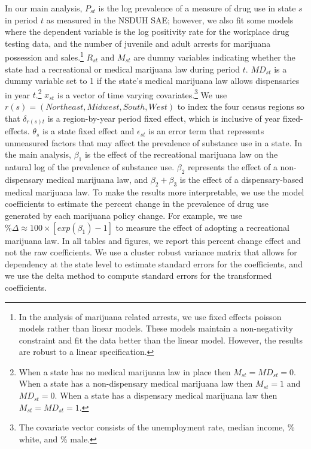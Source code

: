 \documentclass[12pt]{article}%
\begin{document}
In our main analysis, $P_{st}$ is the log prevalence of a measure of drug use in state $s$ in period $t$ as measured in the NSDUH SAE; however, we also fit some models where the dependent variable is the log positivity rate for the workplace drug testing data, and the number of juvenile and adult arrests for marijuana possession and sales.\footnote{In the analysis of marijuana related arrests, we use fixed effects poisson models rather than linear models. These models maintain a non-negativity constraint and fit the data better than the linear model. However, the results are robust to a linear specification.} $R_{st}$ and $M_{st}$ are dummy variables indicating whether the state had a recreational or medical marijuana law during period $t$. $MD_{st}$ is a dummy variable set to 1 if the state’s medical marijuana law allows dispensaries in year $t$.\footnote{When a state has no medical marijuana law in place then  $M_{st}=MD_{st}=0.$ When a state has a non-dispensary medical marijuana law then $M_{st}=1$ and $MD_{st}=0$. When a state has a dispensary medical marijuana law then $M_{st}=MD_{st}=1$.} $x_{st}$ is a vector of time varying covariates.\footnote{The covariate vector consists of the unemployment rate, median income, \% white, and \% male.} We use $r(s)=(Northeast,Midwest,South,West)$ to index the four census regions so that $\delta_{r(s)t}$ is a region-by-year period fixed effect, which is inclusive of year fixed-effects. $\theta_s$ is a state fixed effect and $\epsilon_{st}$ is an error term that represents unmeasured factors that may affect the prevalence of substance use in a state. In the main analysis, $\beta_1$ is the effect of the recreational marijuana law on the natural log of the prevalence of substance use. $\beta_2$ represents the effect of a non-dispensary medical marijuana law, and $\beta_2+\beta_3$ is the effect of a dispensary-based medical marijuana law. 
To make the results more interpretable, we use the model coefficients to estimate the percent change in the prevalence of drug use generated by each marijuana policy change. For example, we use $\% \Delta \approx 100\times \left[exp(\beta_1)-1\right]$ to measure the effect of adopting a recreational marijuana law. In all tables and figures, we report this percent change effect and not the raw coefficients. We use a cluster robust variance matrix that allows for dependency at the state level to estimate standard errors for the coefficients, and we use the delta method to compute standard errors for the transformed coefficients.
\end{document}
